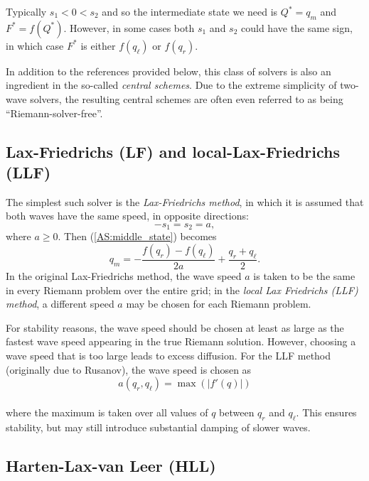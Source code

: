 \documentclass{SIAMbook2016}
\begin{document}
Typically \(s_1 < 0 < s_2\) and so the intermediate state we need is
\(Q^* = q_m\) and \(F^* = f(Q^*)\). However, in some cases both \(s_1\)
and \(s_2\) could have the same sign, in which case \(F^*\) is either
\(f(q_\ell)\) or \(f(q_r)\).

In addition to the references provided below, this class of solvers is
also an ingredient in the so-called \emph{central schemes}. Due to the
extreme simplicity of two-wave solvers, the resulting central schemes
are often even referred to as being ``Riemann-solver-free''.

\hypertarget{lax-friedrichs-lf-and-local-lax-friedrichs-llf}{%
\subsection{Lax-Friedrichs (LF) and local-Lax-Friedrichs
(LLF)}\label{lax-friedrichs-lf-and-local-lax-friedrichs-llf}}

The simplest such solver is the \emph{Lax-Friedrichs method}, in which
it is assumed that both waves have the same speed, in opposite
directions: \[-s_1 = s_2 = a,\] where \(a\ge 0\). Then
(\ref{AS:middle_state}) becomes
\[q_m = -\frac{f(q_r) - f(q_\ell)}{2a} + \frac{q_r + q_\ell}{2}.\] In
the original Lax-Friedrichs method, the wave speed \(a\) is taken to be
the same in every Riemann problem over the entire grid; in the
\emph{local Lax Friedrichs (LLF) method}, a different speed \(a\) may be
chosen for each Riemann problem.

For stability reasons, the wave speed should be chosen at least as large
as the fastest wave speed appearing in the true Riemann solution.
However, choosing a wave speed that is too large leads to excess
diffusion. For the LLF method (originally due to Rusanov), the wave
speed is chosen as \[a(q_r, q_\ell) = \max(|f'(q)|)\]\\
where the maximum is taken over all values of \(q\) between \(q_r\) and
\(q_\ell\). This ensures stability, but may still introduce substantial
damping of slower waves.

\hypertarget{harten-lax-van-leer-hll}{%
\subsection{Harten-Lax-van Leer (HLL)}\label{harten-lax-van-leer-hll}}
\end{document}
